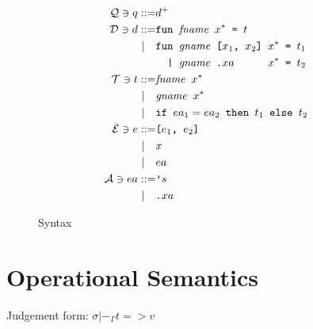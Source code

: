 \documentclass[10pt]{../sigplanconf}
\begin{document}
\begin{figure}\centering
  \begin{align*}
    \mathcal{Q} \ni q ::= & d^{+} \\
    \mathcal{D} \ni d ::= &\texttt{fun \textit{\rmfamily fname} $x^{*}$ = $t$} \\
    | \quad &\texttt{fun \textit{\rmfamily gname} [$x_1$, $x_2$] $x^{*}$ = $t_1$} \\
    & \texttt{\ \ | \textit{\rmfamily gname}\ \texttt{.}$xa$ \hspace{.7cm} $x^{*}$ = $t_2$} \\
    \mathcal{T} \ni t ::= & \texttt{\textit{\rmfamily fname} $x^{*}$} \\
    | \quad & \texttt{\textit{\rmfamily gname} $x^{*}$} \\
    | \quad & \texttt{if $ea_1 = ea_2$ then $t_1$ else $t_2$} \\
    \mathcal{E} \ni e ::= & \texttt{[$e_1$, $e_2$]} \\
    | \quad & x \\
    | \quad & ea \\
    \mathcal{A} \ni ea ::= & \texttt{'}s \\
    | \quad & \texttt{.}xa
  \end{align*}
  \caption{Syntax}
\label{fig:syntax}
\end{figure}


\section{Operational Semantics}
Judgement form: $\sigma |-_\Gamma t => v$
\end{document}

